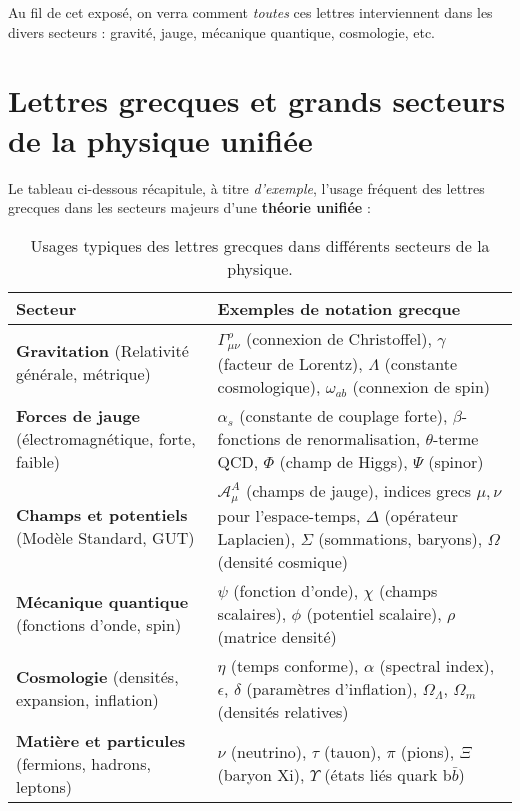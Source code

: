 \documentclass[12pt]{article}
\begin{document}
Au fil de cet exposé, on verra comment \emph{toutes} ces lettres interviennent 
dans les divers secteurs : gravité, jauge, mécanique quantique, cosmologie, etc.

\section{Lettres grecques et grands secteurs de la physique unifiée}

Le tableau ci-dessous récapitule, à titre \emph{d'exemple}, l'usage fréquent 
des lettres grecques dans les secteurs majeurs d'une \textbf{théorie unifiée} :

\begin{table}[h!]
\centering
\begin{tabular}{p{5cm}|p{10cm}}
\hline
\textbf{Secteur} & \textbf{Exemples de notation grecque} \\
\hline
\textbf{Gravitation} (Relativité générale, métrique) 
  & \(\Gamma^\rho_{\mu\nu}\) (connexion de Christoffel), 
    \(\gamma\) (facteur de Lorentz),
    \(\Lambda\) (constante cosmologique), 
    \(\omega_{ab}\) (connexion de spin) 
  \\
\hline
\textbf{Forces de jauge} (électromagnétique, forte, faible)
  & \(\alpha_s\) (constante de couplage forte), 
    \(\beta\)-fonctions de renormalisation, 
    \(\theta\)-terme QCD, 
    \(\Phi\) (champ de Higgs), 
    \(\Psi\) (spinor) 
  \\
\hline
\textbf{Champs et potentiels} (Modèle Standard, GUT)
  & \(\mathcal{A}_\mu^A\) (champs de jauge), 
    indices grecs \(\mu,\nu\) pour l'espace-temps, 
    \(\Delta\) (opérateur Laplacien), 
    \(\Sigma\) (sommations, baryons), 
    \(\Omega\) (densité cosmique)
  \\
\hline
\textbf{Mécanique quantique} (fonctions d'onde, spin)
  & \(\psi\) (fonction d'onde), 
    \(\chi\) (champs scalaires), 
    \(\phi\) (potentiel scalaire), 
    \(\rho\) (matrice densité) 
  \\
\hline
\textbf{Cosmologie} (densités, expansion, inflation)
  & \(\eta\) (temps conforme), 
    \(\alpha\) (spectral index), 
    \(\epsilon\), \(\delta\) (paramètres d'inflation), 
    \(\Omega_\Lambda\), \(\Omega_m\) (densités relatives) 
  \\
\hline
\textbf{Matière et particules} (fermions, hadrons, leptons)
  & \(\nu\) (neutrino), 
    \(\tau\) (tauon), 
    \(\pi\) (pions), 
    \(\Xi\) (baryon Xi), 
    \(\Upsilon\) (états liés quark b\(\bar{b}\)) 
  \\
\hline
\end{tabular}
\caption{Usages typiques des lettres grecques dans différents secteurs de la physique.}
\end{table}
\end{document}
